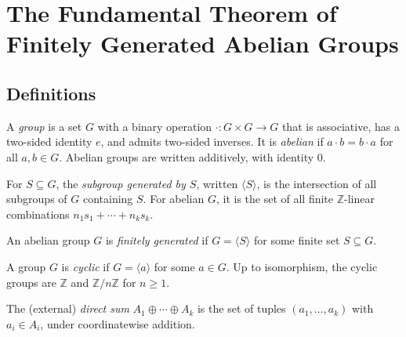 \section{The Fundamental Theorem of Finitely Generated Abelian Groups}

\subsection{Definitions}

\begin{definition}
    \label{def:abelian-group}
    A \emph{group} is a set $G$ with a binary operation $\cdot : G \times G \to G$
    that is associative, has a two-sided identity $e$, and admits two-sided inverses.
    It is \emph{abelian} if $a \cdot b = b \cdot a$ for all $a, b \in G$.
    Abelian groups are written additively, with identity $0$.
\end{definition}

\begin{definition}
    \label{def:subgroup-generated}
    For $S \subseteq G$, the \emph{subgroup generated by $S$}, written
    $\langle S \rangle$, is the intersection of all subgroups of $G$ containing $S$.
    For abelian $G$, it is the set of all finite $\mathbb{Z}$-linear combinations
    $n_1 s_1 + \cdots + n_k s_k$.
\end{definition}

\begin{definition}
    \label{def:fg-abelian}
    An abelian group $G$ is \emph{finitely generated} if $G = \langle S \rangle$
    for some finite set $S \subseteq G$.
\end{definition}

\begin{definition}
    \label{def:cyclic-group}
    A group $G$ is \emph{cyclic} if $G = \langle a \rangle$ for some $a \in G$.
    Up to isomorphism, the cyclic groups are $\mathbb{Z}$ and $\mathbb{Z}/n\mathbb{Z}$ for $n \ge 1$.
\end{definition}

\begin{definition}
    \label{def:direct-sum}
    The (external) \emph{direct sum} $A_1 \oplus \cdots \oplus A_k$ is the set of
    tuples $(a_1, \dots, a_k)$ with $a_i \in A_i$, under coordinatewise addition.
\end{definition}

